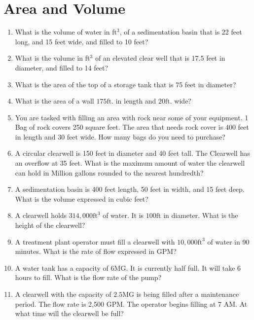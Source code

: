 \documentclass{article}
\begin{document}
\section{Area and Volume}
\begin{enumerate}

\item What is the volume of water in ft$^3$, of a sedimentation basin that is 22 feet long, and 15 feet wide, and filled to 10 feet?

\item What is the volume in ft$^3$ of an elevated clear well that is 17.5 feet in diameter, and filled to 14 feet?

\item What is the area of the top of a storage tank that is 75 feet in diameter?\\

\item  What is the area of a wall $175 \mathrm{ft}$. in length and $20 \mathrm{ft}$. wide?\\

\item  You are tasked with filling an area with rock near some of your equipment. 1 Bag of rock covers 250 square feet. The area that needs rock cover is 400 feet in length and 30 feet wide. How many bags do you need to purchase?\\

\item A circular clearwell is 150 feet in diameter and 40 feet tall. The Clearwell has an overflow at 35 feet. What is the maximum amount of water the clearwell can hold in Million gallons rounded to the nearest hundredth?\\


\item  A sedimentation basin is 400 feet length, 50 feet in width, and 15 feet deep. What is the volume expressed in cubic feet?\\


\item  A clearwell holds $314,000 \mathrm{ft}^{3}$ of water. It is $100 \mathrm{ft}$ in diameter. What is the height of the clearwell?\\

\item  A treatment plant operator must fill a clearwell with $10,000 \mathrm{ft}^{3}$ of water in 90 minutes. What is the rate of flow expressed in GPM?\\


\item  A water tank has a capacity of 6MG. It is currently half full. It will take 6 hours to fill. What is the flow rate of the pump?\\


\item  A clearwell with the capacity of $2.5 \mathrm{MG}$ is being filled after a maintenance period. The flow rate is 2,500 GPM. The operator begins filling at 7 AM. At what time will the clearwell be full?\\


\end{enumerate}
\end{document}
